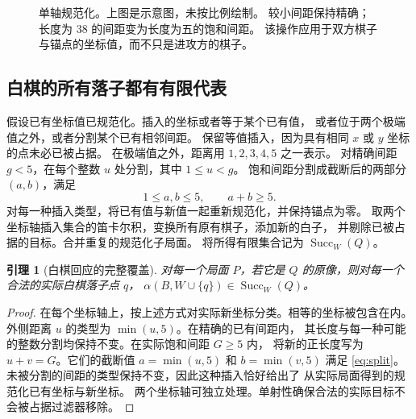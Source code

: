 \documentclass[11pt]{article}
\newtheorem{lemma}[theorem]{引理}
\theoremstyle{definition}
\theoremstyle{remark}
\newcommand{\A}{\alpha}
\newcommand{\Succ}{\operatorname{Succ}}
\begin{document}
\begin{figure}[ht]
\centering
{}
\caption{单轴规范化。上图是示意图，未按比例绘制。
较小间距保持精确；长度为 38 的间距变为长度为五的饱和间距。
该操作应用于双方棋子与锚点的坐标值，而不只是进攻方的棋子。}
\label{fig:gap}
\end{figure}

\subsection{白棋的所有落子都有有限代表}
假设已有坐标值已规范化。插入的坐标或者等于某个已有值，
或者位于两个极端值之外，或者分割某个已有相邻间距。
保留等值插入，因为具有相同 $x$ 或 $y$ 坐标的点未必已被占据。
在极端值之外，距离用 $1,2,3,4,5$ 之一表示。
对精确间距 $g<5$，在每个整数 $u$ 处分割，其中 $1\leq u<g$。
饱和间距分割成截断后的两部分 $(a,b)$，满足
\begin{equation}
 \label{eq:split}
 1\leq a,b\leq5,\qquad a+b\geq5.
\end{equation}
对每一种插入类型，将已有值与新值一起重新规范化，并保持锚点为零。
取两个坐标轴插入集合的笛卡尔积，变换所有原有棋子，添加新的白子，
并剔除已被占据的目标。合并重复的规范化子局面。
将所得有限集合记为 $\Succ_W(Q)$。

\begin{lemma}[白棋回应的完整覆盖]
\label{lem:white}
对每一个局面 $P$，若它是 $Q$ 的原像，则对每一个合法的实际白棋落子点 $q$，
$\A(B,W\cup\{q\})\in\Succ_W(Q)$。
\end{lemma}
\begin{proof}
在每个坐标轴上，按上述方式对实际新坐标分类。相等的坐标被包含在内。
外侧距离 $u$ 的类型为 $\min(u,5)$。在精确的已有间距内，
其长度与每一种可能的整数分割均保持不变。在实际饱和间距 $G\geq5$ 内，
将新的正长度写为 $u+v=G$。它们的截断值 $a=\min(u,5)$ 和
$b=\min(v,5)$ 满足 \eqref{eq:split}。
未被分割的间距的类型保持不变，因此这种插入恰好给出了
从实际局面得到的规范化已有坐标与新坐标。
两个坐标轴可独立处理。单射性确保合法的实际目标不会被占据过滤器移除。
\end{proof}
\end{document}
